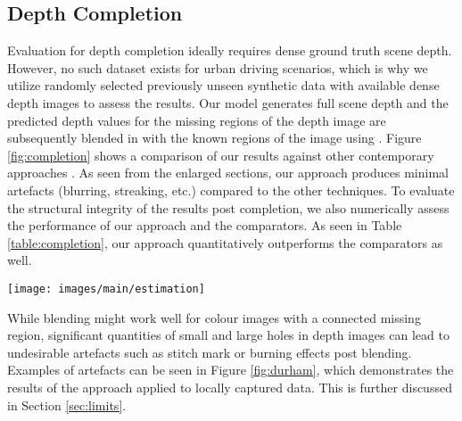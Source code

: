 \documentclass[10pt,twocolumn,letterpaper]{article}
\begin{document}
{\subsection{Depth Completion}
\label{ssec:completion_results}\vspace{-0.1cm}

Evaluation for depth completion ideally requires dense ground truth scene depth. However, no such dataset exists for urban driving scenarios, which is why we utilize randomly selected previously unseen synthetic data with available dense depth images to assess the results. Our model generates full scene depth and the predicted depth values for the missing regions of the depth image are subsequently blended in with the known regions of the image using \cite{perez2003poisson}. Figure \ref{fig:completion} shows a comparison of our results against other contemporary approaches \cite{abarghouei16filling, iizuka2017globally, liu2012guided, yu2018generative}. As seen from the enlarged sections, our approach produces minimal artefacts (blurring, streaking, etc.) compared to the other techniques. To evaluate the structural integrity of the results post completion, we also numerically assess the performance of our approach and the comparators. As seen in Table \ref{table:completion}, our approach quantitatively outperforms the comparators as well.\begin{figure*}[t!]
	\centering
	\texttt{[image: images/main/estimation]}
	\captionsetup[figure]{skip=7pt}
	\label{fig:estimation}\vspace{-0.6cm}
\end{figure*}


While blending \cite{perez2003poisson} might work well for colour images with a connected missing region, significant quantities of small and large holes in depth images can lead to undesirable artefacts such as stitch mark or burning effects post blending. Examples of artefacts can be seen in Figure \ref{fig:durham}, which demonstrates the results of the approach applied to locally captured data. This is further discussed in Section \ref{sec:limits}\vspace{0.0cm}.

}
\end{document}
